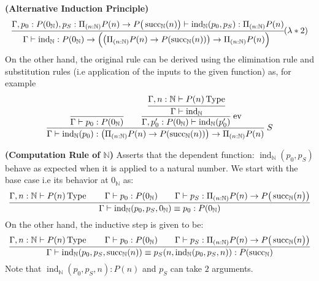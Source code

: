\begin{remark}{\textbf{(Alternative Induction Principle)}}
    \begin{equation*}
        \cfrac{\Gamma,p_0:P(0_\mathbb{N}), p_S:\Pi_{(n:\mathbb{N})}P(n)\rightarrow P\big( \succnat(n) \big)\vdash \operatorname{ind}_\mathbb{N}(p_0,p_S):\Pi_{(n:\mathbb{N})}P(n)}{\Gamma\vdash\operatorname{ind}_\mathbb{N}:P(0_\mathbb{N}) \rightarrow \Big( \big( \Pi_{(n:\mathbb{N})}P(n)\rightarrow P(\succnat(n)) \big) \rightarrow \Pi_{(n:\mathbb{N})}P(n) \Big)\ }(\lambda*2)
    \end{equation*}
    On the other hand, the original rule can be derived using the elimination rule and substitution rules (i.e application of the inputs to the given function) as, for example
    \begin{equation*}
        \cfrac{\cfrac{}{\Gamma\vdash p_0:P(0_\mathbb{N})}\qquad\cfrac{\cfrac{\Gamma,n:\mathbb{N}\vdash P(n)\operatorname{Type}}{\Gamma\vdash\operatorname{ind}_\mathbb{N}}}{\Gamma, p_0':P(0_\mathbb{N})\vdash\operatorname{ind}_\mathbb{N}(p_0')}\text{ ev}}{\Gamma\vdash\operatorname{ind}_\mathbb{N}(p_0):\big( \Pi_{(n:\mathbb{N})}P(n)\rightarrow P(\operatorname{succ}_\mathbb{N}(n)) \big) \rightarrow \Pi_{(n:\mathbb{N})}P(n)}\ S
    \end{equation*}
\end{remark}

\begin{definition}{\textbf{(Computation Rule of $\mathbb{N}$)}}
    Asserts that the dependent function: $\operatorname{ind}_\mathbb{N}(p_0,p_S)$ behave as expected when it is applied to a natural number. We start with the base case i.e its behavior at $0_\mathbb{N}$ as:
    \begin{equation*}
        \cfrac{\Gamma,n:\mathbb{N}\vdash P(n)\operatorname{Type}\qquad\Gamma\vdash p_0:P(0_\mathbb{N})\qquad\Gamma\vdash p_S:\Pi_{(n:\mathbb{N})}P(n)\rightarrow P\big(\operatorname{succ}_\mathbb{N}(n\big)\big)}{\Gamma\vdash\operatorname{ind}_\mathbb{N}(p_0,p_S, 0_\mathbb{N})\equiv p_0:P(0_\mathbb{N})}
    \end{equation*}
    On the other hand, the inductive step is given to be:
    \begin{equation*}
        \cfrac{\Gamma,n:\mathbb{N}\vdash P(n)\operatorname{Type}\qquad\Gamma\vdash p_0:P(0_\mathbb{N})\qquad\Gamma\vdash p_S:\Pi_{(n:\mathbb{N})}P(n)\rightarrow P\big(\operatorname{succ}_\mathbb{N}(n\big)\big)}{\Gamma\vdash\operatorname{ind}_\mathbb{N}(p_0,p_S, \operatorname{succ}_\mathbb{N}(n))\equiv p_S(n, \operatorname{ind}_\mathbb{N}(p_0, p_S, n)):P(\operatorname{succ}_\mathbb{N})}
    \end{equation*}
    Note that $\operatorname{ind}_\mathbb{N}(p_0, p_S, n):P(n)$ and $p_S$ can take $2$ arguments.
\end{definition}

